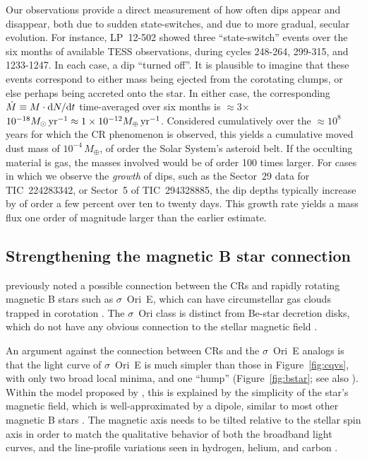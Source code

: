 \documentclass[11pt,twocolumn,tighten]{aastex63}
\begin{document}
Our observations provide a direct measurement of how often dips appear
and disappear, both due to sudden state-switches, and due to more
gradual, secular evolution.  For instance, LP~12-502 showed three
``state-switch'' events over the six months of available TESS
observations, during cycles 248-264, 299-315, and 1233-1247.  In each
case, a dip ``turned off''.  It is plausible to imagine that these
events correspond to either mass being ejected from the corotating
clumps, or else perhaps being accreted onto the star.  In either case,
the corresponding $\dot{M} \equiv M\cdot {\rm d}N/{\rm d}t$
time-averaged over six months is $\approx$3$\times$$10^{-18}
M_\odot\,{\rm yr}^{-1} \approx 1\times10^{-12} M_\oplus\,{\rm
yr}^{-1}$.  Considered cumulatively over the $\approx$$10^8$ years for
which the CR phenomenon is observed, this yields a cumulative moved
dust mass of $10^{-4}\,M_\oplus$, of order the Solar System's asteroid
belt.  If the occulting material is gas, the masses involved would be
of order 100 times larger.  For cases in which we observe the {\it
growth} of dips, such as the Sector~29 data for TIC~224283342, or
Sector~5 of TIC~294328885, the dip depths typically increase by of
order a few percent over ten to twenty days.  This growth rate yields
a mass flux one order of magnitude larger than the earlier estimate.


\subsection{Strengthening the magnetic B star connection}

\citet{2017AJ....153..152S} previously noted a possible connection
between the CRs and rapidly rotating magnetic B stars such as
$\sigma$~Ori~E, which can have circumstellar gas clouds trapped in
corotation \citep{2005ApJ...630L..81T}.  The $\sigma$~Ori class is
distinct from Be-star decretion disks, which do not have any obvious
connection to the stellar magnetic field \citep{2013A&ARv..21...69R}.

An argument against the connection between CRs and the $\sigma$~Ori~E
analogs is that the light curve of $\sigma$~Ori~E is much simpler than
those in Figure~\ref{fig:cqvs}, with only two broad local minima, and
one ``hump'' (Figure~\ref{fig:bstar}; see also
\citealt{2022ApJ...924L..10J}).  Within the model proposed by
\citeauthor{2005ApJ...630L..81T}, this is explained by the simplicity
of the star's magnetic field, which is well-approximated by a dipole,
similar to most other magnetic B stars
\citep{2007A&A...475.1053A,2009ARA&A..47..333D}.  The magnetic axis
needs to be tilted relative to the stellar spin axis in order to match
the qualitative behavior of both the broadband light curves, and the
line-profile variations seen in hydrogen, helium, and carbon
\citep{2012MNRAS.419..959O}.
\end{document}
